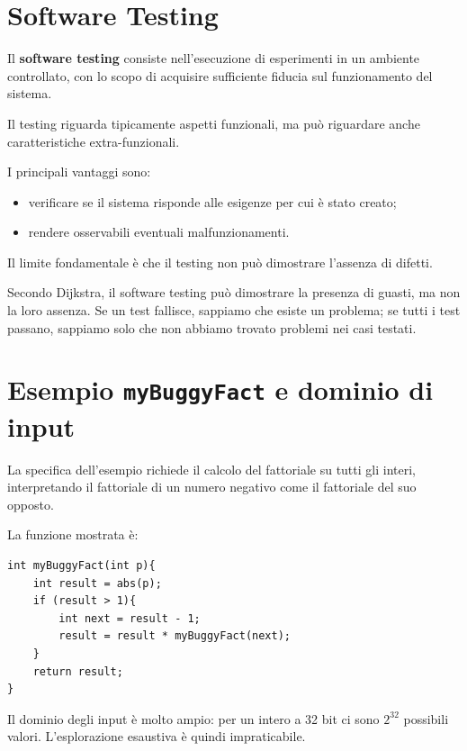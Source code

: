 \section{Software Testing}

Il \textbf{software testing} consiste nell'esecuzione di esperimenti in un ambiente controllato, con lo scopo di acquisire sufficiente fiducia sul funzionamento del sistema.

Il testing riguarda tipicamente aspetti funzionali, ma può riguardare anche caratteristiche extra-funzionali.

I principali vantaggi sono:

\begin{itemize}
    \item verificare se il sistema risponde alle esigenze per cui è stato creato;
    \item rendere osservabili eventuali malfunzionamenti.
\end{itemize}

Il limite fondamentale è che il testing non può dimostrare l'assenza di difetti.

\begin{notaesame}
Secondo Dijkstra, il software testing può dimostrare la presenza di guasti, ma non la loro assenza. Se un test fallisce, sappiamo che esiste un problema; se tutti i test passano, sappiamo solo che non abbiamo trovato problemi nei casi testati.
\end{notaesame}


\section{Esempio \texttt{myBuggyFact} e dominio di input}

La specifica dell'esempio richiede il calcolo del fattoriale su tutti gli interi, interpretando il fattoriale di un numero negativo come il fattoriale del suo opposto.

La funzione mostrata è:

\begin{verbatim}
int myBuggyFact(int p){
    int result = abs(p);
    if (result > 1){
        int next = result - 1;
        result = result * myBuggyFact(next);
    }
    return result;
}
\end{verbatim}

Il dominio degli input è molto ampio: per un intero a 32 bit ci sono \(2^{32}\) possibili valori. L'esplorazione esaustiva è quindi impraticabile.


